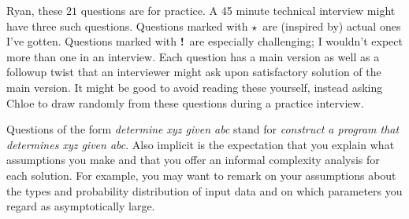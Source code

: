 \documentclass{article}
\newcommand{\real}{{\color{green}$\star$\ }}
\newcommand{\hard}{{\color{red}\textbf{!}\ }}
\begin{document}
    Ryan, these $21$ questions are for practice.  A 45 minute technical
    interview might have three such questions.  Questions marked with \real are
    (inspired by) actual ones I've gotten.  Questions marked with \hard are
    especially challenging; I wouldn't expect more than one in an interview.
    Each question has a main version as well as a followup twist that an
    interviewer might ask upon satisfactory solution of the main version.  It
    might be good to avoid reading these yourself, instead asking Chloe to draw
    randomly from these questions during a practice interview.

    Questions of the form \emph{determine xyz given abc} stand for
    \emph{construct a program that determines xyz given abc}.  Also implicit is
    the expectation that you explain what assumptions you make and that you
    offer an informal complexity analysis for each solution.  For example, you
    may want to remark on your assumptions about the types and probability
    distribution of input data and on which parameters you regard as
    asymptotically large.
\end{document}
